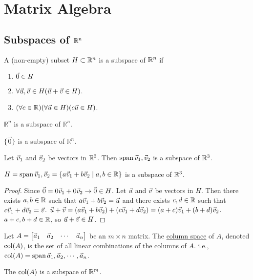 \documentclass[10pt,a4paper]{article}
\begin{document}
\newpage

\section{Matrix Algebra}

\subsection{Subspaces of $\mathbb{R}^n$}

\begin{definition}
A (non-empty) subset $H\subset \mathbb{R}^n$ is a subspace of $\mathbb{R}^n$ if
\begin{enumerate}
	\item $\vec{0} \in H$
	\item $\forall \vec{u},\vec{v}\in H(\vec{u}+\vec{v}\in H)$.
	\item $(\forall c\in \mathbb{R}) (\forall \vec{u}\in H) (c\vec{u}\in H)$.
\end{enumerate}
\end{definition}

\begin{example}$\mathbb{R}^n$ is a subspace of $\mathbb{R}^n$.\end{example}

\begin{example}
$\{\vec{0}\}$ is a subspace of $\mathbb{R}^n$.
\end{example}

\begin{example}
Let $\vec{v}_1$ and $\vec{v}_2$ be vectors in $\mathbb{R}^3$. Then $\text{span}\,\vec{v}_1,\vec{v}_2$ is a subspace of $\mathbb{R}^3$.
\begin{recall}
$H=\text{span}\,\vec{v}_1,\vec{v}_2=\{a\vec{v}_1+b\vec{v}_2\mid a,b\in \mathbb{R}\}$ is a subspace of $\mathbb{R}^3$.
\end{recall}
\begin{proof}
Since $\vec{0}=0\vec{v}_1+0\vec{v}_2 \rightarrow \vec{0}\in H$. Let $\vec{u}$ and $\vec{v}$ be vectors in $H$. Then there exists $a,b\in \mathbb{R}$ such that $a\vec{v}_1+b\vec{v}_2=\vec{u}$ and there exists $c,d\in\mathbb{R}$ such that $c\vec{v}_1 + d\vec{v}_2 = \vec{v}$. $\vec{u}+\vec{v} = (a\vec{v}_1+b\vec{v}_2) + (c\vec{v}_1+d\vec{v}_2) = (a+c)\vec{v}_1 + (b+d)\vec{v}_2$. $a+c,b+d\in\mathbb{R}$, so $\vec{u}+\vec{v}\in H$.\end{proof}
\end{example}

\begin{definition}
	Let $A = \begin{bmatrix}\vec{a}_1 &\vec{a}_2 &\cdots &\vec{a}_n \end{bmatrix}$ be an $m\times n$ matrix. The \underline{column space} of $A$, denoted $\text{col}(A)$, is the set of all linear combinations of the columns of $A$. i.e., $\text{col}(A) = \text{span}\,\vec{a}_1,\vec{a}_2,\cdots,\vec{a}_n$.
\end{definition}
\begin{remark}The $\text{col}(A)$ is a subspace of $\mathbb{R}^m$.\end{remark}
\end{document}
